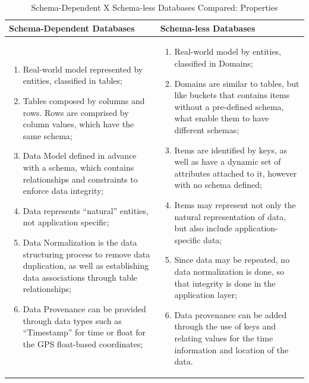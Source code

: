 \begin{table}
    \label{tab:schema-vs-schemaless}
    \caption{Schema-Dependent X Schema-less Databases Compared: Properties}
    \begin{center}
    \begin{tabular}{|p{210pt}|p{210pt}|}\hline
    Schema-Dependent Databases & Schema-less Databases\\\hline
    \begin{enumerate}
      \item Real-world model represented by entities, classified in tables;
      \item Tables composed by columns and rows. Rows are comprised by column
      values, which have the same schema;
      \item Data Model defined in advance with a schema, which contains
      relationships and constraints to enforce data integrity;
      \item Data represents ``natural'' entities, not application specific;
      \item Data Normalization is the data structuring process to remove data
      duplication, as well as establishing data associations through table
      relationships;
      \item Data Provenance can be provided through data types such as
      ``Timestamp'' for time or float for the GPS float-based coordinates; 
    \end{enumerate} 
    & 
    \begin{enumerate}
      \item Real-world model by entities, classified in Domains;
      \item Domains are similar to tables, but like buckets that contains items
      without a pre-defined schema, what enable them to have different schemas;
      \item Items are identified by keys, as well as have a dynamic set of
      attributes attached to it, however with no schema defined;
      \item Items may represent not only the natural representation of data, but
      also include application-specific data;
      \item Since data may be repeated, no data normalization is done, so that
      integrity is done in the application layer;
      \item Data provenance can be added through the use of keys and relating
      values for the time information and location of the data.
    \end{enumerate}
    \\\hline
    \end{tabular}
    \end{center}
\end{table}

